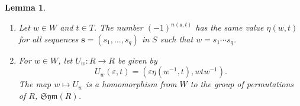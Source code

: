 \documentclass{article}
\theoremstyle{thmstyle}
\newtheorem{lemma}[theorem]{Lemma}
\theoremstyle{defstyle}
\begin{document}
\begin{lemma}
\begin{enumerate}[label=(\arabic*)]
    \item Let $w\in W$ and $t\in T$. The number $(-1)^{n(\mathbf s, t)}$ has the same value $\eta(w, t)$ for all sequences $\mathbf s = (s_1,\dots,s_q)$ in $S$ such that $w = s_1\cdots s_q$.
    \item For $w\in W$, let $U_w: R\to R$ be given by 
    \begin{equation*}
        U_w(\varepsilon, t) = \left(\varepsilon\eta(w^{-1}, t), wtw^{-1}\right).
    \end{equation*}
    The map $w\mapsto U_w$ is a homomorphism from $W$ to the group of permutations of $R$, $\mathfrak{Sym}(R)$.
\end{enumerate}
\end{lemma}
\end{document}
